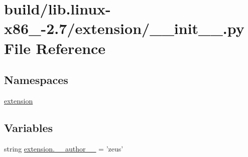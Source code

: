\hypertarget{build_2lib_8linux-x86__64-2_87_2extension_2____init_____8py}{}\section{build/lib.linux-\/x86\+\_-\/2.7/extension/\+\_\+\+\_\+init\+\_\+\+\_\+.py File Reference}
\label{build_2lib_8linux-x86__64-2_87_2extension_2____init_____8py}
\subsection*{Namespaces}
\begin{DoxyCompactItemize}
\item 
 \hyperlink{namespaceextension}{extension}
\end{DoxyCompactItemize}
\subsection*{Variables}
\begin{DoxyCompactItemize}
\item 
string \hyperlink{namespaceextension_ad06490e8fc6c7ef7ade87e176957461b}{extension.\+\_\+\+\_\+author\+\_\+\+\_\+} = 'zeus'
\end{DoxyCompactItemize}
